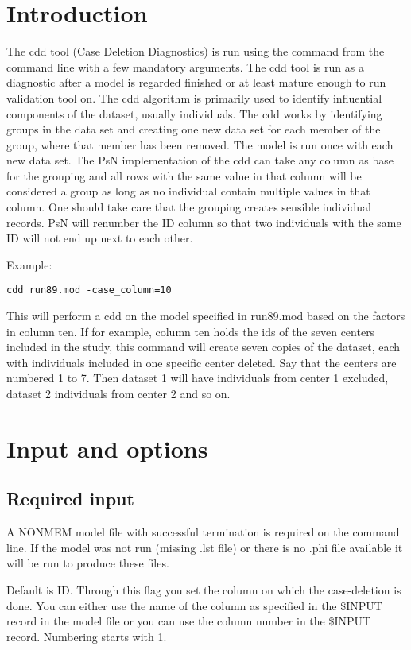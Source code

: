 

\usepackage{hyperref}



\maketitle
\newcommand{\guidetoolname}{cdd}
\tableofcontents
\newpage
\section{Introduction}
The cdd tool (Case Deletion Diagnostics) is run using the command from the command line with a few mandatory arguments. 
The cdd tool is run as a diagnostic after a model is regarded finished or at least mature enough to run validation tool on. 
The cdd algorithm is primarily used to identify influential components of the dataset, usually individuals. The cdd works by identifying groups in the data set and creating one new data set for each member of the group, where that member has been removed. The model is run once with each new data set. The PsN implementation of the cdd can take any column as base for the grouping and all rows with the same value in that column will be considered a group as long as no individual contain multiple values in that column. One should take care that the grouping creates sensible individual records. PsN will renumber the ID column so that two individuals with the same ID will not end up next to each other.

Example:
\begin{verbatim}
cdd run89.mod -case_column=10
\end{verbatim}
This will perform a cdd on the model specified in run89.mod based on the factors in column ten. If for example, 
column ten holds the ids of the seven centers included in the study, this command will create seven copies of the dataset, each with 
individuals included in one specific center deleted. Say that the centers are numbered 1 to 7. Then dataset 1 will have individuals from 
center 1 excluded, dataset 2 individuals from center 2 and so on.

\section{Input and options}

\subsection{Required input}
A NONMEM model file with successful termination is required on the command line. If the model was not run (missing .lst file) or there is no .phi file available it will be run to produce these files.
\begin{optionlist}
Default is ID. Through this flag you set the column on which the case-deletion is done. You can either use the name of the column as specified in the \mbox{\$INPUT} record in the model file or you can use the column number in the \mbox{\$INPUT} record. Numbering starts with 1. 
\end{optionlist}

